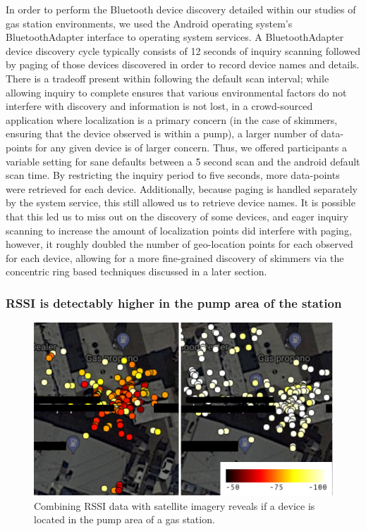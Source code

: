 In order to perform the Bluetooth device discovery detailed within our studies
of gas station environments, we used the Android operating system's
BluetoothAdapter interface to operating system services. A BluetoothAdapter
device discovery cycle typically consists of 12 seconds of inquiry scanning
followed by paging of those devices discovered in order to record device names
and details. There is a tradeoff present within following the default scan
interval; while allowing inquiry to complete ensures that various environmental
factors do not interfere with discovery and information is not lost, in a
crowd-sourced application where localization is a primary concern (in the case
of skimmers, ensuring that the device observed is within a pump), a larger
number of data-points for any given device is of larger concern. Thus, we offered
participants a variable setting for sane defaults between a 5 second scan and
the android default scan time. By restricting the inquiry period to five
seconds, more data-points were retrieved for each device. Additionally, because
paging is handled separately by the system service, this still allowed us to
retrieve device names. It is possible that this led us to miss out on the
discovery of some devices, and eager inquiry scanning to increase the amount of
localization points did interfere with paging, however, it roughly doubled the
number of geo-location points for each observed for each device, allowing for a
more fine-grained discovery of skimmers via the concentric ring based techniques
discussed in a later section. 

\subsubsection*{RSSI is detectably higher in the pump area of the station}

\begin{figure}
\centering
\includegraphics[width=\linewidth]{fig/rssi_motivation.pdf}
\caption{
\label{fig:rssi}
  Combining RSSI data with satellite imagery reveals if a device is located in the pump area of a gas station.
}
\end{figure}


